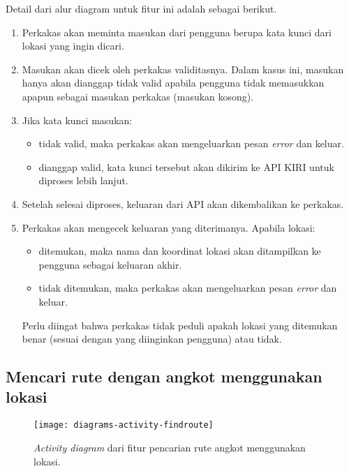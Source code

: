 Detail dari alur diagram untuk fitur ini adalah sebagai berikut.

\begin{enumerate}
	\item Perkakas akan meminta masukan dari pengguna berupa kata kunci dari lokasi yang ingin dicari.
	\item Masukan akan dicek oleh perkakas validitasnya. Dalam kasus ini, masukan hanya akan dianggap tidak valid apabila pengguna tidak memasukkan apapun sebagai masukan perkakas (masukan kosong).
	\item Jika kata kunci masukan:

	\begin{itemize}
		\item tidak valid, maka perkakas akan mengeluarkan pesan \textit{error} dan keluar.
		\item dianggap valid, kata kunci tersebut akan dikirim ke API KIRI untuk diproses lebih lanjut.
	\end{itemize}
	
	\item Setelah selesai diproses, keluaran dari API akan dikembalikan ke perkakas.
	\item Perkakas akan mengecek keluaran yang diterimanya. Apabila lokasi:
	
	\begin{itemize}
		\item ditemukan, maka nama dan koordinat \latlon lokasi akan ditampilkan ke pengguna sebagai keluaran akhir.
		\item tidak ditemukan, maka perkakas akan mengeluarkan pesan \textit{error} dan keluar.
	\end{itemize}
	
	Perlu diingat bahwa perkakas tidak peduli apakah lokasi yang ditemukan benar (sesuai dengan yang diinginkan pengguna) atau tidak.
	
\end{enumerate}

\subsection{Mencari rute dengan angkot menggunakan \latlon lokasi}
\label{sec:design-diagrams-findroute}

\begin{figure}[ht]
    \centering
    \texttt{[image: diagrams-activity-findroute]}
    \caption[Diagram \textit{use case} perkakas yang akan dibangun]{\textit{Activity diagram} dari fitur pencarian rute angkot menggunakan \latlon lokasi.}
    \label{fig:diagrams-activity-direct}
\end{figure}

